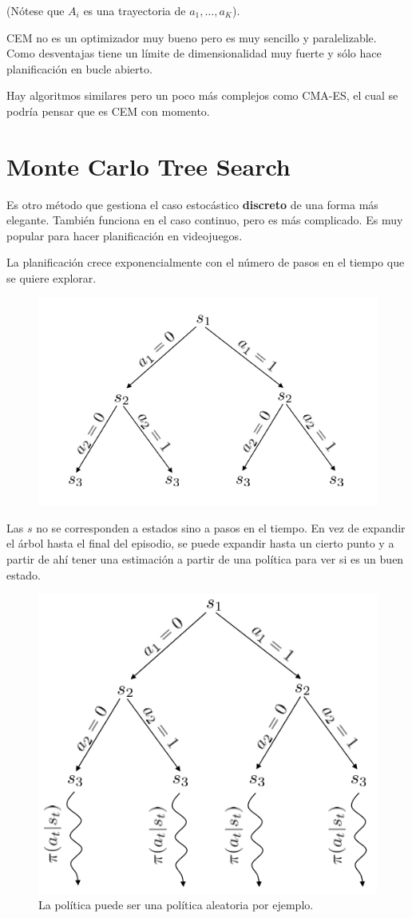 (Nótese que $A_i$ es una trayectoria de $a_1,\ldots,a_K$).

CEM no es un optimizador muy bueno pero es muy sencillo y paralelizable. Como desventajas
tiene un límite de dimensionalidad muy fuerte y sólo hace planificación en bucle abierto.

Hay algoritmos similares pero un poco más complejos como CMA-ES, el cual se podría pensar que es
CEM con momento.

\section{Monte Carlo Tree Search}%
\label{sec:monte_carlo_tree_search}

Es otro método que gestiona el caso estocástico \textbf{discreto} de una forma más elegante.
También funciona en el caso continuo, pero es más complicado. Es muy popular para hacer
planificación en videojuegos.

La planificación crece exponencialmente con el número de pasos en el tiempo que se quiere
explorar.

\begin{figure}[H]
	\centering
	\includegraphics[width=0.4\linewidth]{figures/2020-06-18-122724_532x327_scrot.png}
\end{figure}

Las $s$ no se corresponden a estados sino a pasos en el tiempo. En vez de expandir el árbol
hasta el final del episodio, se puede expandir hasta un cierto punto y a partir de ahí tener
una estimación a partir de una política para ver si es un buen estado.

\begin{figure}[H]
	\centering
	\includegraphics[width=0.4\linewidth]{figures/2020-06-18-122954_490x433_scrot.png}
	\caption{La política puede ser una política aleatoria por ejemplo.}
\end{figure}


